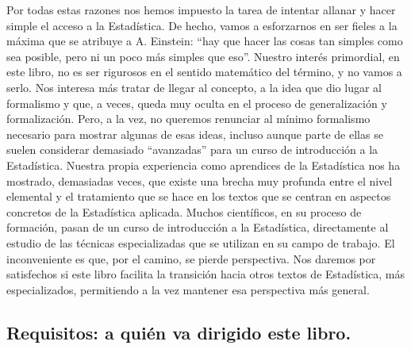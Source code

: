 Por todas estas razones nos hemos impuesto la tarea de intentar allanar y hacer simple el acceso a la Estadística. De hecho, vamos a esforzarnos en ser fieles a la máxima que se atribuye a A. Einstein: ``hay que hacer las cosas tan simples como sea posible, pero ni un poco más simples que eso''. Nuestro interés primordial, en este libro, no es ser rigurosos en el sentido matemático del término, y no vamos a serlo. Nos interesa más tratar de llegar al concepto, a la idea que dio lugar al formalismo y que, a veces, queda muy oculta en el proceso de generalización y formalización. Pero, a la vez, no queremos renunciar al mínimo formalismo necesario para mostrar algunas de esas ideas, incluso aunque parte de ellas se suelen considerar demasiado ``avanzadas'' para un curso de introducción a la Estadística. Nuestra propia experiencia como aprendices de la Estadística nos ha mostrado, demasiadas veces, que existe una brecha muy profunda entre el nivel elemental y el tratamiento que se hace en los textos que se centran en aspectos concretos de la Estadística aplicada.  Muchos científicos, en su proceso de formación,  pasan de un curso de introducción a la Estadística, directamente al estudio de las técnicas especializadas que se utilizan en su campo de trabajo. El inconveniente es que, por el camino, se pierde perspectiva. Nos daremos por satisfechos si este libro facilita la transición hacia otros textos de Estadística, más especializados, permitiendo a la vez mantener esa perspectiva más general.

\subsection*{Requisitos: a quién va dirigido este libro. }

